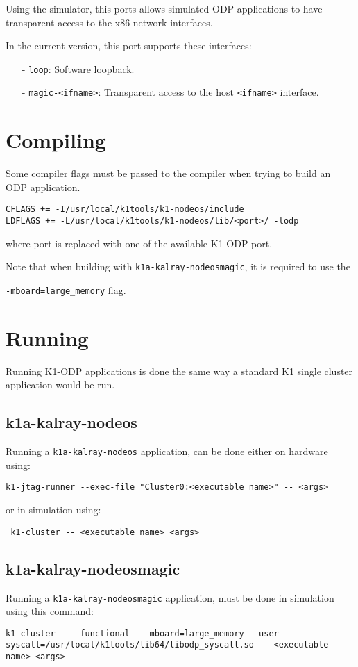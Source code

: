 \documentclass{trkalray}
\begin{document}
Using the simulator, this ports allows simulated ODP applications to
have transparent access to the x86 network interfaces.

In the current version, this port supports these interfaces:
\begin{itemize}
\item[-]{\texttt{loop}: Software loopback.}
\item[-]{\texttt{magic-<ifname>}: Transparent access to the host
  \texttt{<ifname>} interface.}
\end{itemize}

\section{Compiling}

Some compiler flags must be passed to the compiler when trying to
build an ODP application.

\begin{lstlisting}
CFLAGS += -I/usr/local/k1tools/k1-nodeos/include
LDFLAGS += -L/usr/local/k1tools/k1-nodeos/lib/<port>/ -lodp
\end{lstlisting}
where port is replaced with one of the available K1-ODP port.

Note that when building with \texttt{k1a-kalray-nodeosmagic}, it is
required to use the

 \texttt{-mboard=large\_memory} flag.

\section{Running}

Running K1-ODP applications is done the same way a standard K1 single
cluster application would be run.

\subsection{k1a-kalray-nodeos}
Running a \texttt{k1a-kalray-nodeos} application, can be done either
on hardware using:
\begin{lstlisting}
k1-jtag-runner --exec-file "Cluster0:<executable name>" -- <args>
\end{lstlisting}
or in simulation using:
\begin{lstlisting}
 k1-cluster -- <executable name> <args>
\end{lstlisting}

\subsection{k1a-kalray-nodeosmagic}
Running a \texttt{k1a-kalray-nodeosmagic} application, must be done in
simulation using this command:
\begin{lstlisting}
k1-cluster   --functional  --mboard=large_memory --user-syscall=/usr/local/k1tools/lib64/libodp_syscall.so -- <executable name> <args>
\end{lstlisting}
\end{document}
